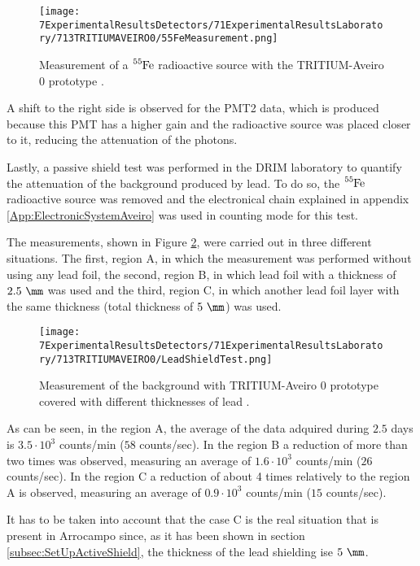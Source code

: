 \begin{figure}[htbp]
\centering
\texttt{[image: 7ExperimentalResultsDetectors/71ExperimentalResultsLaboratory/713TRITIUMAVEIRO0/55FeMeasurement.png]}
\caption{Measurement of a $\ce{^{55}Fe}$ radioactive source with the TRITIUM-Aveiro 0 prototype \cite{ExperimentalPaperCarlos}.\label{fig:55FeMeasurement}}
\end{figure}

A shift to the right side is observed for the PMT2 data, which is produced because this PMT has a higher gain and the radioactive source was placed closer to it, reducing the attenuation of the photons.

Lastly, a passive shield test was performed in the DRIM laboratory to quantify the attenuation of the background produced by lead. To do so, the $\ce{^{55}Fe}$ radioactive source was removed and the electronical chain explained in appendix \ref{App:ElectronicSystemAveiro} was used in counting mode for this test.

The measurements, shown in Figure \ref{fig:LeadShieldTest}, were carried out in three different situations. The first, region A, in which the measurement was performed without using any lead foil, the second, region B, in which lead foil with a thickness of $2.5~\mm$ was used and the third, region C, in which another lead foil layer with the same thickness (total thickness of $5~\mm$) was used.

\begin{figure}[htbp]
\centering
\texttt{[image: 7ExperimentalResultsDetectors/71ExperimentalResultsLaboratory/713TRITIUMAVEIRO0/LeadShieldTest.png]}
\caption{Measurement of the background with TRITIUM-Aveiro 0 prototype covered with different thicknesses of lead \cite{ExperimentalPaperCarlos}.\label{fig:LeadShieldTest}}
\end{figure}

As can be seen, in the region A, the average of the data adquired during $2.5$ days is $3.5 \cdot{} 10^3$ counts/min ($58$ counts/sec). In the region B a reduction of more than two times was observed, measuring an average of $1.6 \cdot{} 10^3$ counts/min ($26$ counts/sec). In the region C a reduction of about 4 times relatively to the region A is observed, measuring an average of $0.9 \cdot{} 10^3$ counts/min ($15$ counts/sec).

It has to be taken into account that the case C is the real situation that is present in Arrocampo since, as it has been shown in section \ref{subsec:SetUpActiveShield}, the thickness of the lead shielding ise $5~\mm$.

